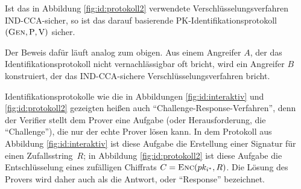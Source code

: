 \begin{theorem} 
Ist das in Abbildung \ref{fig:id:protokoll2} verwendete
Verschlüsselungsverfahren IND-CCA-sicher, so ist das darauf basierende
PK-Identifikationsprotokoll\indexPKIdentificationProtocol$(\textsc{Gen},
\mathrm{P}, \mathrm{V})$ sicher.
\end{theorem}

\begin{beweisidee} 
Der Beweis dafür läuft analog zum obigen. Aus einem Angreifer $A$, der
das Identifikationsprotokoll nicht vernachlässigbar oft bricht, wird ein
Angreifer $B$ konstruiert, der das IND-CCA-sichere
Verschlüsselungsverfahren bricht.
\end{beweisidee}

Identifikationsprotokolle wie die in Abbildungen \ref{fig:id:interaktiv}
und \ref{fig:id:protokoll2} gezeigten heißen auch
"`Challenge-Response-Verfahren"', denn der Verifier stellt dem Prover
eine Aufgabe (oder Herausforderung, die "`Challenge"'), die nur der
echte Prover lösen kann. In dem Protokoll aus Abbildung
\ref{fig:id:interaktiv} ist diese Aufgabe die Erstellung einer Signatur
für einen Zufallsstring~$R$; in Abbildung \ref{fig:id:protokoll2} ist
diese Aufgabe die Entschlüsselung eines zufälligen Chiffrats $C =
\textsc{Enc}(pk_{i^*}, R)$. Die Lösung des Provers wird daher auch als die
Antwort, oder "`Response"' bezeichnet.


